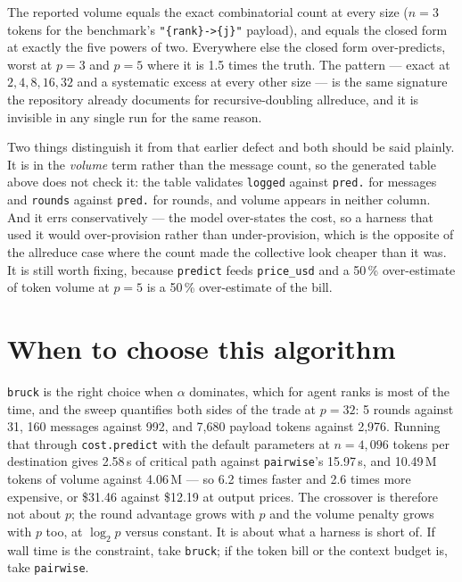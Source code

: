 \documentclass[11pt]{article}
\begin{document}
The reported volume equals the exact combinatorial count at every size ($n = 3$ tokens for the
benchmark's \verb|"{rank}->{j}"| payload), and equals the closed form at exactly the five
powers of two. Everywhere else the closed form over-predicts, worst at $p=3$ and $p=5$ where it
is 1.5 times the truth. The pattern --- exact at $2, 4, 8, 16, 32$ and a systematic excess at
every other size --- is the same signature the repository already documents for
recursive-doubling allreduce, and it is invisible in any single run for the same reason.

Two things distinguish it from that earlier defect and both should be said plainly. It is in
the \emph{volume} term rather than the message count, so the generated table above does not
check it: the table validates \texttt{logged} against \texttt{pred.} for messages and
\texttt{rounds} against \texttt{pred.} for rounds, and volume appears in neither column. And it
errs conservatively --- the model over-states the cost, so a harness that used it would
over-provision rather than under-provision, which is the opposite of the allreduce case where
the count made the collective look cheaper than it was. It is still worth fixing, because
\texttt{predict} feeds \texttt{price\_usd} and a 50\,\% over-estimate of token volume at $p=5$
is a 50\,\% over-estimate of the bill.

\section{When to choose this algorithm}

\texttt{bruck} is the right choice when $\alpha$ dominates, which for agent ranks is most of
the time, and the sweep quantifies both sides of the trade at $p=32$: 5 rounds against 31, 160
messages against 992, and 7,680 payload tokens against 2,976. Running that through
\texttt{cost.predict} with the default parameters at $n = 4{,}096$ tokens per destination gives
2.58\,s of critical path against \texttt{pairwise}'s 15.97\,s, and 10.49\,M tokens of volume
against 4.06\,M --- so 6.2 times faster and 2.6 times more expensive, or \$31.46 against
\$12.19 at output prices. The crossover is therefore not about $p$; the round advantage grows
with $p$ and the volume penalty grows with $p$ too, at $\log_2 p$ versus constant. It is about
what a harness is short of. If wall time is the constraint, take \texttt{bruck}; if the token
bill or the context budget is, take \texttt{pairwise}.
\end{document}
